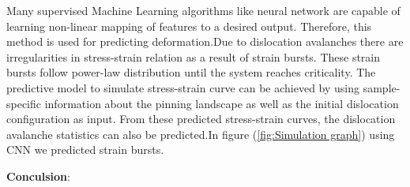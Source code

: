 Many supervised Machine Learning algorithms like neural network are capable of learning non-linear mapping of features to a desired output. Therefore, this method is used for predicting deformation.Due to dislocation avalanches there are irregularities in stress-strain relation as a result of strain bursts. These strain bursts follow power-law distribution until the system reaches criticality. The predictive model to simulate stress-strain curve can be achieved by using sample-specific information about the pinning landscape as well as the initial dislocation configuration as input. From these predicted stress-strain curves, the dislocation avalanche statistics can also be predicted.In figure (\ref{fig:Simulation graph}) using CNN we predicted strain bursts.

\textbf{Conculsion}: 





